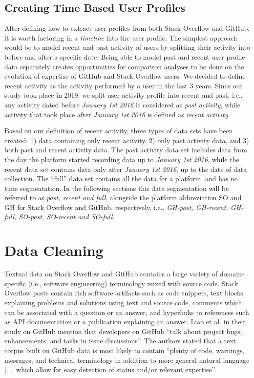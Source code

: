     \subsection{Creating Time Based User Profiles} \label{past_recent_full_segm}
        After defining how to extract user profiles from both Stack Overflow and GitHub, it is worth factoring in a \textit{timeline} into the user profile. The simplest approach would be to model recent and past activity of users by splitting their activity into before and after a specific date. Being able to model past and recent user profile data separately creates opportunities for comparison analyses to be done on the evolution of expertise of GitHub and Stack Overflow users. We decided to define recent activity as the activity performed by a user in the last 3 years. Since our study took place in 2019, we split user activity profile into recent and past, i.e., any activity dated before \textit{January 1st 2016} is considered as \textit{past activity}, while activity that took place after \textit{January 1st 2016} is defined as \textit{recent activity}. 
        
        Based on our definition of recent activity, three types of data sets have been created: 1) data containing only recent activity, 2) only past activity data, and 3) both past and recent activity data. The past activity data set includes data from the day the platform started recording data up to \textit{January 1st 2016}, while the recent data set contains data only after \textit{January 1st 2016}, up to the date of data collection. The ``full'' data set contains all the data for a platform, and has no time segmentation. In the following sections this data segmentation will be referred to as \emph{past, recent and full}, alongside the platform abbreviation SO and GH for Stack Overflow and GitHub, respectively, i.e.,  \emph{GH-past, GH-recent, GH-full, SO-past, SO-recent and SO-full}.

\section{Data Cleaning}\label{sec:data_cleaning}

    Textual data on Stack Overflow and GitHub contains a large variety of domain-specific (i.e., software engineering) terminology mixed with source code. Stack Overflow posts contain rich software artifacts such as code snippets, text blocks explaining problems and solutions using text and source code, comments which can be associated with a question or an answer, and hyperlinks to references such as API documentation or a publication explaining an answer. Liao et al. \cite{liao2019status} in their study on GitHub mention that developers on GitHub ``talk about project bugs, enhancements, and tasks in issue discussions''. The authors stated that a text corpus built on GitHub data is most likely  to contain ``plenty of code, warnings, messages, and technical terminology in addition to more general natural language [...] which allow for easy detection of status and/or relevant expertise''.
    
